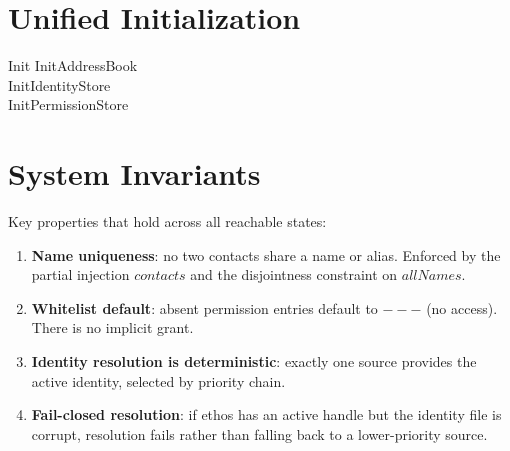 \documentclass[a4paper,10pt,fleqn]{article}
\begin{document}
\section{Unified Initialization}

\begin{schema}{Init}
InitAddressBook \\
InitIdentityStore \\
InitPermissionStore
\end{schema}

\section{System Invariants}

Key properties that hold across all reachable states:

\begin{enumerate}
\item \textbf{Name uniqueness}: no two contacts share a name or alias.
  Enforced by the partial injection $contacts$ and the disjointness
  constraint on $allNames$.
\item \textbf{Whitelist default}: absent permission entries default to
  $---$ (no access). There is no implicit grant.
\item \textbf{Identity resolution is deterministic}: exactly one source
  provides the active identity, selected by priority chain.
\item \textbf{Fail-closed resolution}: if ethos has an active handle but
  the identity file is corrupt, resolution fails rather than falling
  back to a lower-priority source.
\end{enumerate}
\end{document}
